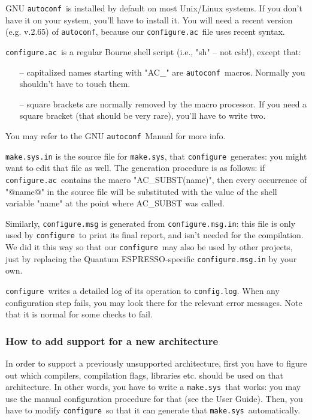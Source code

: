 \documentclass[12pt,a4paper]{article}
\def\qe{{\sc Quantum ESPRESSO}}
\def\configure{\texttt{configure}}
\def\configurac{\texttt{configure.ac}}
\def\autoconf{\texttt{autoconf}}
\def\make.sys{\texttt{make.sys}}
\begin{document}
GNU \autoconf\ is installed by default on most Unix/Linux systems.  If
you don't have it on your system, you'll have to install it. You will
need a recent version (e.g. v.2.65) of \autoconf, because our 
\configurac\
file uses recent syntax.

\configurac\ is a regular Bourne shell script (i.e., "sh" -- not csh!), 
except that:
\begin{itemize}
\item[--] capitalized names starting with "AC\_" are \autoconf\
  macros.  Normally you shouldn't have to touch them. 
\item[--] square brackets are normally removed by the macro processor.
  If you need a square bracket (that should be very rare), you'll have
  to write two. 
\end{itemize}

You may refer to the GNU \autoconf\ Manual for more info.

\texttt{make.sys.in} is the source file for \make.sys, that
\configure\ generates: you might want to edit that file as well. 
The generation procedure is as follows: if \configurac\ contains the macro
"AC\_SUBST(name)", then every occurrence of "@name@" in the source
file will be substituted with the value of the shell variable "name"
at the point where AC\_SUBST was called.

Similarly, \configure\texttt{.msg} is generated from \configure\texttt{.msg.in}: this
file is only used by \configure\ to print its final report, and isn't
needed for the compilation.  We did it this way so that our
\configure\ may also be used by other projects, just by replacing the
\qe-specific \configure\texttt{.msg.in} by your own.

\configure\ writes a detailed log of its operation to \texttt{config.log}.
When any configuration step fails, you may look there for the relevant
error messages.  Note that it is normal for some checks to fail.

\subsubsection{How to add support for a new architecture}

In order to support a previously unsupported architecture, first you
have to figure out which compilers, compilation flags, libraries
etc. should be used on that architecture.
In other words, you have to write a \make.sys\ that works: you may use
the manual configuration procedure for that (see the 
User Guide).  Then, you have to modify \configure\ so that it can
generate that \make.sys\ automatically.
\end{document}

